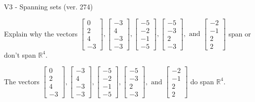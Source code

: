 \begin{exercise}
  \begin{exerciseTitle}V3 - Spanning sets (ver. 274)\end{exerciseTitle}
  \begin{exerciseStatement}
    Explain why the vectors \(\left[\begin{array}{r}
0 \\
2 \\
4 \\
-3
\end{array}\right] , \left[\begin{array}{r}
-3 \\
4 \\
-3 \\
-3
\end{array}\right] , \left[\begin{array}{r}
-5 \\
-2 \\
-1 \\
-5
\end{array}\right] , \left[\begin{array}{r}
-5 \\
-3 \\
2 \\
-3
\end{array}\right] , \text{ and } \left[\begin{array}{r}
-2 \\
-1 \\
2 \\
2
\end{array}\right]\) span or don't span \(\mathbb{R}^4\). 
	


  \end{exerciseStatement}
  \begin{exerciseAnswer}
   The vectors \(\left[\begin{array}{r}
0 \\
2 \\
4 \\
-3
\end{array}\right] , \left[\begin{array}{r}
-3 \\
4 \\
-3 \\
-3
\end{array}\right] , \left[\begin{array}{r}
-5 \\
-2 \\
-1 \\
-5
\end{array}\right] , \left[\begin{array}{r}
-5 \\
-3 \\
2 \\
-3
\end{array}\right] , \text{ and } \left[\begin{array}{r}
-2 \\
-1 \\
2 \\
2
\end{array}\right]\) 
  	 do  
	span \(\mathbb{R}^4\).
  



\end{exerciseAnswer}
\end{exercise}
